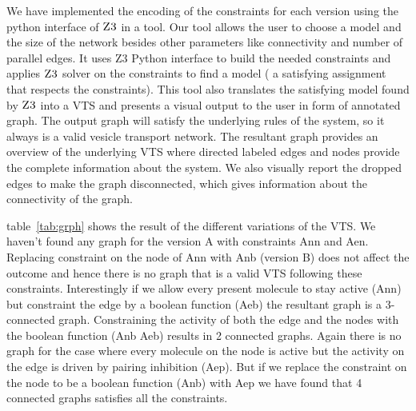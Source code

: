 
%

We have implemented the encoding of the constraints for each version
using the python interface of $\textsc{Z3}$ in a tool.
%
Our tool allows the user to choose a model and the size of the network
besides other parameters like connectivity and number of parallel
edges.
%
It uses Z3 Python interface to build the needed constraints and
applies $\textsc{Z3}$ solver on the constraints to find a model ( a
satisfying assignment that respects the constraints).
%
This tool also translates the satisfying model found by $\textsc{Z3}$ into
a VTS and presents a visual output to the user in form of annotated graph.
%
The output graph will satisfy the underlying rules of the system, so
it always is a valid vesicle transport network.
%
The resultant graph provides an overview of the underlying VTS
where directed labeled edges and nodes provide the
complete information about the system.
%
We also visually report the dropped edges to make the graph
disconnected, which gives information about the connectivity of the
graph.

table~\ref{tab:grph} shows the result of the different variations of the VTS. We haven't found any graph for the version A with constraints Ann and Aen. Replacing constraint on the node of Ann with Anb (version B) does not affect the outcome and hence there is no graph that is a valid VTS following these constraints. Interestingly if we allow every present molecule to stay active (Ann) but constraint the edge by a boolean function (Aeb) the resultant graph is a 3-connected graph. Constraining the activity of both the edge and the nodes with the boolean function (Anb Aeb) results in 2 connected graphs. Again there is no graph for the case where every molecule on the node is active but the activity on the edge is driven by pairing inhibition (Aep). But if we replace the constraint on the node to be a boolean function (Anb) with Aep we have found that 4 connected graphs satisfies all the constraints. 


